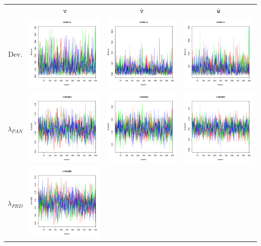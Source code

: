 \documentclass[letter,12pt]{article}
\begin{document}
\begin{table}
\centering
\begin{tabular}{cccc}
                     & $\texttt{v}$ & $\bar{\texttt{v}}$ & $\bar{\texttt{w}}$ \\ 
    Dev.             & \includegraphics[width=.15\columnwidth]{../graphs/traceplots/2006d0v_1.pdf} &
                        \includegraphics[width=.15\columnwidth]{../graphs/traceplots/2006d0vbar_1.pdf} &
                         \includegraphics[width=.15\columnwidth]{../graphs/traceplots/2006d0wbar_1.pdf} \\
    $\lambda_{PAN}$   & \includegraphics[width=.15\columnwidth]{../graphs/traceplots/2006d0v_2.pdf} &
                        \includegraphics[width=.15\columnwidth]{../graphs/traceplots/2006d0vbar_2.pdf} &
                         \includegraphics[width=.15\columnwidth]{../graphs/traceplots/2006d0wbar_2.pdf} \\
    $\lambda_{PRD}$   & \includegraphics[width=.15\columnwidth]{../graphs/traceplots/2006d0v_3.pdf} &

\end{tabular}
\end{table}
\end{document}
